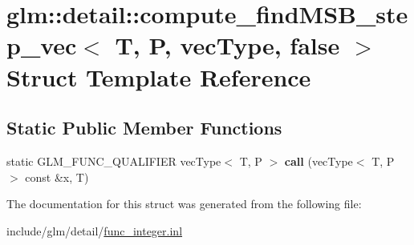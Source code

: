 \hypertarget{structglm_1_1detail_1_1compute__findMSB__step__vec_3_01T_00_01P_00_01vecType_00_01false_01_4}{}\section{glm\+:\+:detail\+:\+:compute\+\_\+find\+M\+S\+B\+\_\+step\+\_\+vec$<$ T, P, vec\+Type, false $>$ Struct Template Reference}
\label{structglm_1_1detail_1_1compute__findMSB__step__vec_3_01T_00_01P_00_01vecType_00_01false_01_4}
\subsection*{Static Public Member Functions}
\begin{DoxyCompactItemize}
\item 
\mbox{\label{structglm_1_1detail_1_1compute__findMSB__step__vec_3_01T_00_01P_00_01vecType_00_01false_01_4_a6be49d6f06a7dd467a63a87a6d2af757}} 
static G\+L\+M\+\_\+\+F\+U\+N\+C\+\_\+\+Q\+U\+A\+L\+I\+F\+I\+ER vec\+Type$<$ T, P $>$ {\bfseries call} (vec\+Type$<$ T, P $>$ const \&x, T)
\end{DoxyCompactItemize}


The documentation for this struct was generated from the following file\+:\begin{DoxyCompactItemize}
\item 
include/glm/detail/\hyperlink{func__integer_8inl}{func\+\_\+integer.\+inl}\end{DoxyCompactItemize}
